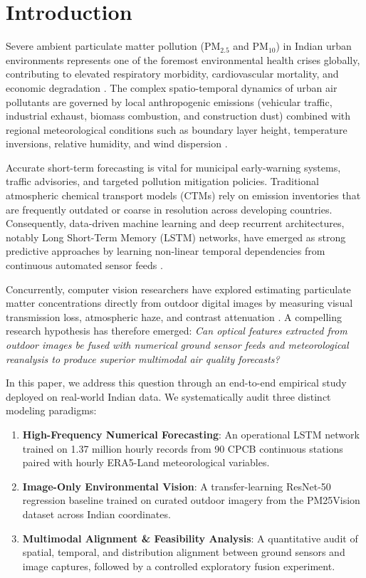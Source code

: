 \documentclass[conference]{IEEEtran}
\begin{document}
\section{Introduction}
Severe ambient particulate matter pollution ($\text{PM}_{2.5}$ and $\text{PM}_{10}$) in Indian urban environments represents one of the foremost environmental health crises globally, contributing to elevated respiratory morbidity, cardiovascular mortality, and economic degradation \cite{cpcb2009naaqs}. The complex spatio-temporal dynamics of urban air pollutants are governed by local anthropogenic emissions (vehicular traffic, industrial exhaust, biomass combustion, and construction dust) combined with regional meteorological conditions such as boundary layer height, temperature inversions, relative humidity, and wind dispersion \cite{munoz2021era5land}.

Accurate short-term forecasting is vital for municipal early-warning systems, traffic advisories, and targeted pollution mitigation policies. Traditional atmospheric chemical transport models (CTMs) rely on emission inventories that are frequently outdated or coarse in resolution across developing countries. Consequently, data-driven machine learning and deep recurrent architectures, notably Long Short-Term Memory (LSTM) networks, have emerged as strong predictive approaches by learning non-linear temporal dependencies from continuous automated sensor feeds \cite{hochreiter1997lstm, zheng2015forecasting}.

Concurrently, computer vision researchers have explored estimating particulate matter concentrations directly from outdoor digital images by measuring visual transmission loss, atmospheric haze, and contrast attenuation \cite{liu2016particle, he2016resnet}. A compelling research hypothesis has therefore emerged: \textit{Can optical features extracted from outdoor images be fused with numerical ground sensor feeds and meteorological reanalysis to produce superior multimodal air quality forecasts?}

In this paper, we address this question through an end-to-end empirical study deployed on real-world Indian data. We systematically audit three distinct modeling paradigms:
\begin{enumerate}
    \item \textbf{High-Frequency Numerical Forecasting}: An operational LSTM network trained on 1.37 million hourly records from 90 CPCB continuous stations paired with hourly ERA5-Land meteorological variables.
    \item \textbf{Image-Only Environmental Vision}: A transfer-learning ResNet-50 regression baseline trained on curated outdoor imagery from the PM25Vision dataset across Indian coordinates.
    \item \textbf{Multimodal Alignment \& Feasibility Analysis}: A quantitative audit of spatial, temporal, and distribution alignment between ground sensors and image captures, followed by a controlled exploratory fusion experiment.
\end{enumerate}
\end{document}
